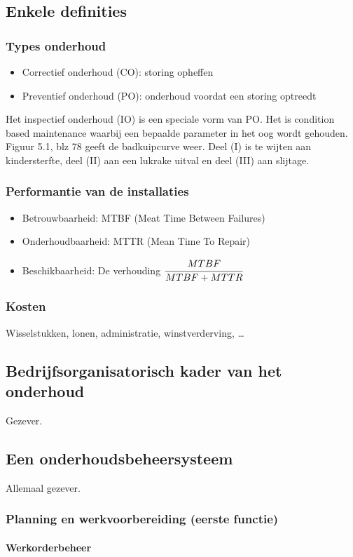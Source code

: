 \documentclass[12pt]{article}
\begin{document}
\subsection{Enkele definities}
\subsubsection{Types onderhoud}
\begin{itemize}
\item Correctief onderhoud (CO): storing opheffen
\item Preventief onderhoud (PO): onderhoud voordat een storing optreedt
\end{itemize}
Het inspectief onderhoud (IO) is een speciale vorm van PO. Het is condition based maintenance waarbij een bepaalde parameter in het oog wordt gehouden.\\
Figuur 5.1, blz 78 geeft de badkuipcurve weer. Deel (I) is te wijten aan kindersterfte, deel (II) aan een lukrake uitval en deel (III) aan slijtage.
\subsubsection{Performantie van de installaties}
\begin{itemize}
\item Betrouwbaarheid: MTBF (Meat Time Between Failures)
\item Onderhoudbaarheid: MTTR (Mean Time To Repair)
\item Beschikbaarheid: De verhouding $\cfrac{MTBF}{MTBF + MTTR}$
\end{itemize}
\subsubsection{Kosten}
Wisselstukken, lonen, administratie, winstverderving, \dots
\subsection{Bedrijfsorganisatorisch kader van het onderhoud}
Gezever.
\subsection{Een onderhoudsbeheersysteem}
Allemaal gezever.
\subsubsection{Planning en werkvoorbereiding (eerste functie)}
\paragraph{Werkorderbeheer}
\end{document}
